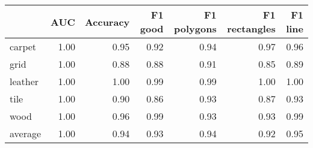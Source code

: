 \begin{tabular}{lrrrrrr}
\toprule
{} &  AUC &  Accuracy &  F1 good &  F1 polygons &  F1 rectangles &  F1 line \\
\midrule
carpet  & 1.00 &      0.95 &     0.92 &         0.94 &           0.97 &     0.96 \\
grid    & 1.00 &      0.88 &     0.88 &         0.91 &           0.85 &     0.89 \\
leather & 1.00 &      1.00 &     0.99 &         0.99 &           1.00 &     1.00 \\
tile    & 1.00 &      0.90 &     0.86 &         0.93 &           0.87 &     0.93 \\
wood    & 1.00 &      0.96 &     0.99 &         0.93 &           0.93 &     0.99 \\
average & 1.00 &      0.94 &     0.93 &         0.94 &           0.92 &     0.95 \\
\bottomrule
\end{tabular}
